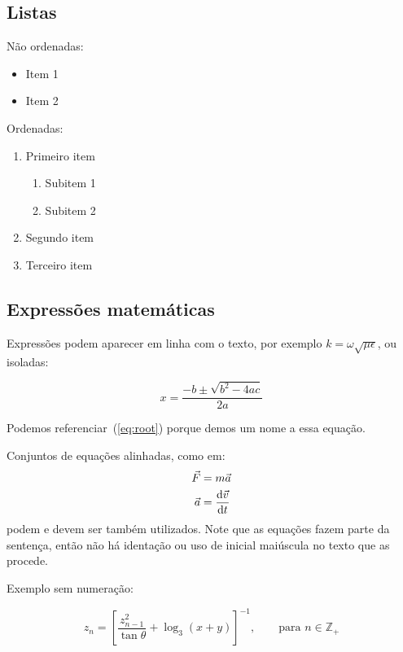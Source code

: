 \documentclass[a4paper,11pt]{article}
\begin{document}
\subsection{Listas}

Não ordenadas:

\begin{itemize}
	\item Item 1
	\item Item 2
\end{itemize}

Ordenadas:

\begin{enumerate}
	\item Primeiro item
	\begin{enumerate}
		\item Subitem 1
		\item Subitem 2
	\end{enumerate}
	\item Segundo item
	\item Terceiro item
\end{enumerate}


\subsection{Expressões matemáticas}
\label{ssec:math}

Expressões podem aparecer em linha com o texto, por exemplo $k = \omega \sqrt{\mu \epsilon}$, ou isoladas:

\begin{equation}
\label{eq:root}
x = \frac{-b \pm \sqrt{b^2 - 4ac}}{2a}
\end{equation}

Podemos referenciar~(\ref{eq:root}) porque demos um nome a essa equação.

Conjuntos de equações alinhadas, como em:
%
\begin{align}
\vec{F} &= m \vec{a} \\
\vec{a} &= \frac{{\rm d}\vec{v}}{{\rm d}t}
\end{align}
%
podem e devem ser também utilizados.
Note que as equações fazem parte da sentença, então não há identação ou uso de inicial maiúscula no texto que as procede.

Exemplo sem numeração:

\begin{equation*}
z_n = \left[\frac{z_{n-1}^2}{\tan\theta} + \log_3(x + y)\right]^{-1},\qquad\text{para } n \in \mathbb{Z}_+
\end{equation*}
\end{document}
